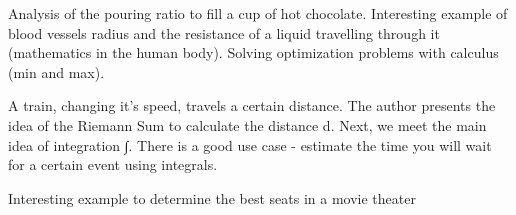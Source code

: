 \documentclass{cornell}
\begin{document}
%
{Analysis of the pouring ratio to fill a cup of hot chocolate. Interesting example of blood vessels radius and the resistance of a liquid travelling through it (mathematics in the human body). Solving optimization problems with calculus (min and max).}%

\begin{tcolorbox}
\end{tcolorbox}

%
{A train, changing it's speed, travels a certain distance. The author presents the idea of the Riemann Sum to calculate the distance d. Next, we meet the main idea of integration ∫. There is a good use case - estimate the time you will wait for a certain event using integrals.}%

%
{Interesting example to determine the best seats in a movie theater}%


\end{document}
